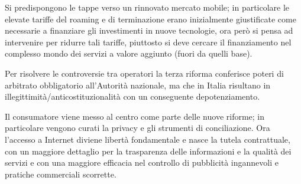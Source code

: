 Si predispongono le tappe verso un rinnovato mercato mobile; in particolare le elevate tariffe del roaming e di terminazione erano inizialmente giustificate come necessarie a finanziare gli investimenti in nuove tecnologie, ora però si pensa ad intervenire per ridurre tali tariffe, piuttosto si deve cercare il finanziamento nel complesso mondo dei servizi a valore aggiunto (fuori da quelli base).\newline

Per risolvere le controversie tra operatori la terza riforma conferisce poteri di arbitrato obbligatorio all’Autorità nazionale, ma che in Italia risultano in illegittimità/anticostituzionalità con un conseguente depotenziamento.\newline

Il consumatore viene messo al centro come parte delle nuove riforme; in particolare vengono curati la privacy e gli strumenti di conciliazione. Ora l’accesso a Internet diviene libertà fondamentale e nasce la tutela contrattuale, con un maggiore dettaglio per la trasparenza delle informazioni e la qualità dei servizi e con una maggiore efficacia nel controllo di pubblicità ingannevoli e pratiche commerciali scorrette.